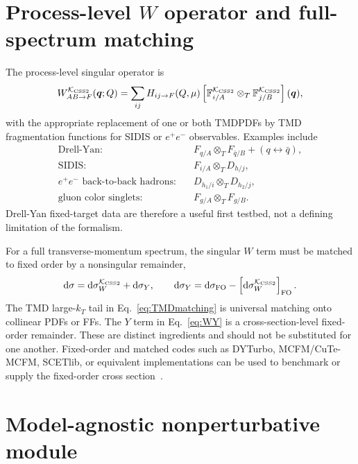 \documentclass[aps,prd,preprint,superscriptaddress,nofootinbib,longbibliography]{revtex4-2}
\newcommand{\dd}{\mathrm d}
\newcommand{\bq}{\bm q}
\newcommand{\KCSS}{\mathcal K_{\rm CSS2}}
\newcommand{\ot}{\otimes_T}
\newcommand{\FO}{\mathrm{FO}}
\begin{document}
\section{Process-level $W$ operator and full-spectrum matching}

The process-level singular operator is
\begin{equation}
  W_{AB\to F}^{\KCSS}(\bq;Q)
  =\sum_{ij}H_{ij\to F}(Q,\mu)
  \left[\mathbb F_{i/A}^{\KCSS}\ot \mathbb F_{j/B}^{\KCSS}\right](\bq),
  \label{eq:generic-W}
\end{equation}
with the appropriate replacement of one or both TMDPDFs by TMD fragmentation functions for SIDIS or $e^+e^-$ observables.  Examples include
\begin{align}
  \text{Drell-Yan:}&\quad F_{q/A}\ot F_{\bar q/B}+(q\leftrightarrow \bar q),\\
  \text{SIDIS:}&\quad F_{i/A}\ot D_{h/j},\\
  e^+e^-\text{ back-to-back hadrons:}&\quad D_{h_1/i}\ot D_{h_2/j},\\
  \text{gluon color singlets:}&\quad F_{g/A}\ot F_{g/B}.
\end{align}
Drell-Yan fixed-target data are therefore a useful first testbed, not a defining limitation of the formalism.

For a full transverse-momentum spectrum, the singular $W$ term must be matched to fixed order by a nonsingular remainder,
\begin{equation}
  \dd\sigma=\dd\sigma_W^{\KCSS}+\dd\sigma_Y,
  \qquad
  \dd\sigma_Y=\dd\sigma_{\FO}-\left[\dd\sigma_W^{\KCSS}\right]_{\FO}.
  \label{eq:WY}
\end{equation}
The TMD large-$k_T$ tail in Eq.~\eqref{eq:TMDmatching} is universal matching onto collinear PDFs or FFs.  The $Y$ term in Eq.~\eqref{eq:WY} is a cross-section-level fixed-order remainder.  These are distinct ingredients and should not be substituted for one another.  Fixed-order and matched codes such as DYTurbo, MCFM/CuTe-MCFM, SCETlib, or equivalent implementations can be used to benchmark or supply the fixed-order cross section~\cite{CamardaEtAlDYTurbo2020,CamardaCieriFerrera2021,NeumannCampbell2023,BillisMichelTackmann2025}.

\section{Model-agnostic nonperturbative module}
\end{document}
